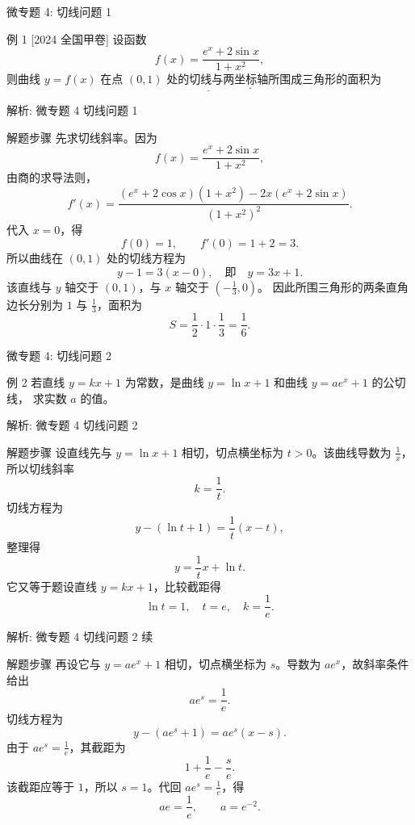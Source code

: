 ﻿\documentclass[aspectratio=169,10pt]{ctexbeamer}
\begin{document}
\begin{frame}[t]{微专题 4: 切线问题 1}
\large
\begin{block}{例 1}
[2024 全国甲卷] 设函数
\[
f(x)=\frac{e^x+2\sin x}{1+x^2},
\]
则曲线 $y=f(x)$ 在点 $(0,1)$ 处的切线与两坐标轴所围成三角形的面积为
\[
\underline{\hspace{3cm}}.
\]
\end{block}
\end{frame}

\begin{frame}[t,allowframebreaks]{解析: 微专题 4 切线问题 1}
\tiny
\begin{block}{解题步骤}
先求切线斜率。因为
\[
f(x)=\frac{e^x+2\sin x}{1+x^2},
\]
由商的求导法则，
\[
f'(x)=\frac{(e^x+2\cos x)(1+x^2)-2x(e^x+2\sin x)}{(1+x^2)^2}.
\]
代入 $x=0$，得
\[
f(0)=1,\qquad f'(0)=1+2=3.
\]
所以曲线在 $(0,1)$ 处的切线方程为
\[
y-1=3(x-0),\quad 即\quad y=3x+1.
\]
该直线与 $y$ 轴交于 $(0,1)$，与 $x$ 轴交于 $\left(-\frac13,0\right)$。
因此所围三角形的两条直角边长分别为 $1$ 与 $\frac13$，面积为
\[
S=\frac12\cdot1\cdot\frac13=\frac16.
\]
\end{block}
\end{frame}

\begin{frame}[t]{微专题 4: 切线问题 2}
\large
\begin{block}{例 2}
若直线 $y=kx+1$ 为常数，是曲线 $y=\ln x+1$ 和曲线 $y=ae^x+1$ 的公切线，
求实数 $a$ 的值。
\end{block}
\end{frame}

\begin{frame}[t,allowframebreaks]{解析: 微专题 4 切线问题 2}
\tiny
\begin{block}{解题步骤}
设直线先与 $y=\ln x+1$ 相切，切点横坐标为 $t>0$。该曲线导数为 $\frac1x$，
所以切线斜率
\[
k=\frac1t.
\]
切线方程为
\[
y-(\ln t+1)=\frac1t(x-t),
\]
整理得
\[
y=\frac1t x+\ln t.
\]
它又等于题设直线 $y=kx+1$，比较截距得
\[
\ln t=1,\quad t=e,\quad k=\frac1e.
\]
\end{block}
\end{frame}

\begin{frame}[t,allowframebreaks]{解析: 微专题 4 切线问题 2 续}
\tiny
\begin{block}{解题步骤}
再设它与 $y=ae^x+1$ 相切，切点横坐标为 $s$。导数为 $ae^x$，故斜率条件给出
\[
ae^s=\frac1e.
\]
切线方程为
\[
y-(ae^s+1)=ae^s(x-s).
\]
由于 $ae^s=\frac1e$，其截距为
\[
1+\frac1e-\frac{s}{e}.
\]
该截距应等于 $1$，所以 $s=1$。代回 $ae^s=\frac1e$，得
\[
ae=\frac1e,\qquad a=e^{-2}.
\]
\end{block}
\end{frame}
\end{document}
